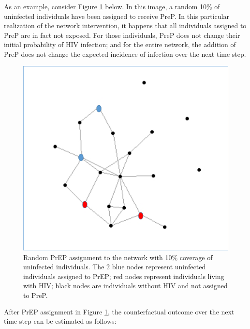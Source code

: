 \documentclass{article}
\theoremstyle{definition}
\begin{document}
As an example, consider Figure \ref{fig: Figure 3}  below. In this image, a random 10\% of uninfected individuals have been assigned to receive PreP. In this particular realization of the network intervention, it happens that all individuals assigned to PreP are in fact not exposed. For those individuals, PreP does not change their initial probability of HIV infection; and for the entire network, the addition of PreP does not change the expected incidence of infection over the next time step.
\begin{figure}[H]
    \centering
    \includegraphics[scale=0.5]{Original Figures/Network Example 2.png}
    \caption{Random PrEP assignment to the network with 10\% coverage of uninfected individuals. The 2 blue nodes represent uninfected individuals assigned to PrEP; red nodes represent individuals living with HIV; black nodes are individuals without HIV and not assigned to PreP.}
    \label{fig: Figure 3}
\end{figure}




After PrEP assignment in Figure \ref{fig: Figure 3}, the counterfactual outcome over the next time step can be estimated as follows:
\end{document}
